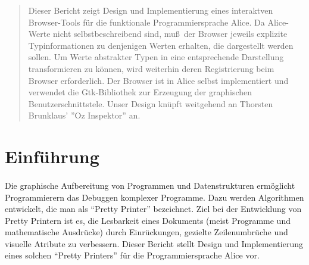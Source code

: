 \documentclass[12pt,a4paper]{article}
\begin{document}
\begin{titlepage}
\vspace{4mm}



\begin{abstract}
\normalsize
Dieser Bericht zeigt Design und Implementierung eines 
interaktven Browser-Tools f\"{u}r die funktionale Programmiersprache 
Alice. Da Alice-Werte nicht selbstbeschreibend sind, 
mu\ss \, der Browser jeweils explizite Typinformationen zu denjenigen  
Werten erhalten, die dargestellt werden sollen. 
Um Werte abstrakter Typen in eine entsprechende Darstellung 
transformieren zu k\"{o}nnen, wird weiterhin 
deren Registrierung beim Browser erforderlich. 
Der Browser ist in Alice selbst implementiert und verwendet die Gtk-Bibliothek
zur Erzeugung der graphischen Benutzerschnittstele.
Unser Design kn\"{u}pft weitgehend an Thorsten Brunklaus' ''Oz Inspektor'' 
\cite{br:oz} an.
\end{abstract}

\vspace*{\fill}

\end{titlepage}


\section{Einf\"{u}hrung}  

\paragraph{}

Die graphische Aufbereitung von Programmen und Datenstrukturen erm\"{o}glicht 
Programmierern das Debuggen komplexer Programme. 
Dazu werden Algorithmen entwickelt, die man als ``Pretty Printer'' bezeichnet. 
Ziel bei der Entwicklung von Pretty Printern ist es, die Lesbarkeit eines 
Dokuments (meist Programme und mathematische Ausdr\"{u}cke) durch 
Einr\"{u}ckungen, gezielte Zeilenumbr\"{u}che und 
visuelle Atribute zu verbessern.
Dieser Bericht stellt Design und Implementierung 
eines solchen ``Pretty Printers'' f\"{u}r die Programmiersprache Alice vor. 
\end{document}
